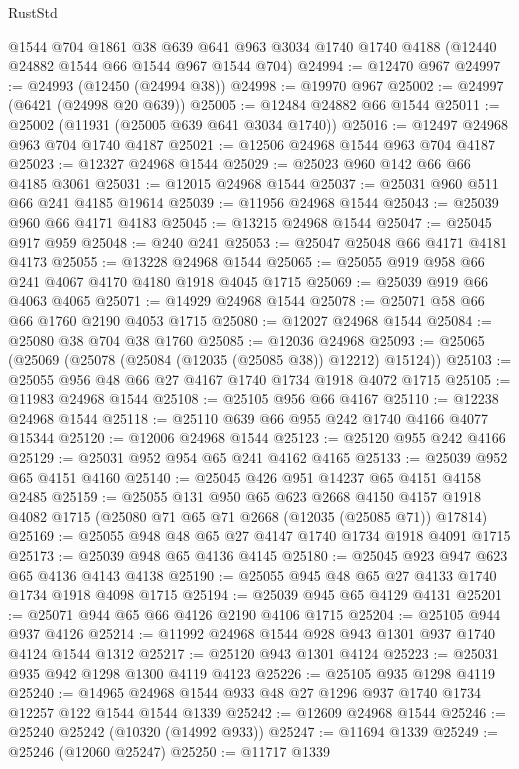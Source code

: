 \begin{lexlean}{RustStd}
\begin{coremodule}
    @1544
    @704
    @1861
    @38
    @639
    @641
    @963
    @3034
    @1740
    @1740
    @4188
    (@12440 @24882 @1544 @66 @1544 @967 @1544 @704)
@24994 := @12470 @967
@24997 := @24993 (@12450 (@24994 @38))
@24998 := @19970 @967
@25002 := @24997 (@6421 (@24998 @20 @639))
@25005 := @12484 @24882 @66 @1544
@25011 := @25002 (@11931 (@25005 @639 @641 @3034 @1740))
@25016 := @12497 @24968 @963 @704 @1740 @4187
@25021 := @12506 @24968 @1544 @963 @704 @4187
@25023 := @12327 @24968 @1544
@25029 := @25023 @960 @142 @66 @66 @4185 @3061
@25031 := @12015 @24968 @1544
@25037 := @25031 @960 @511 @66 @241 @4185 @19614
@25039 := @11956 @24968 @1544
@25043 := @25039 @960 @66 @4171 @4183
@25045 := @13215 @24968 @1544
@25047 := @25045 @917 @959
@25048 := @240 @241
@25053 := @25047 @25048 @66 @4171 @4181 @4173
@25055 := @13228 @24968 @1544
@25065 := @25055 @919 @958 @66 @241 @4067 @4170 @4180 @1918 @4045 @1715
@25069 := @25039 @919 @66 @4063 @4065
@25071 := @14929 @24968 @1544
@25078 := @25071 @58 @66 @66 @1760 @2190 @4053 @1715
@25080 := @12027 @24968 @1544
@25084 := @25080 @38 @704 @38 @1760
@25085 := @12036 @24968
@25093 := @25065 (@25069 (@25078 (@25084 (@12035 (@25085 @38)) @12212) @15124))
@25103 := @25055 @956 @48 @66 @27 @4167 @1740 @1734 @1918 @4072 @1715
@25105 := @11983 @24968 @1544
@25108 := @25105 @956 @66 @4167
@25110 := @12238 @24968 @1544
@25118 := @25110 @639 @66 @955 @242 @1740 @4166 @4077 @15344
@25120 := @12006 @24968 @1544
@25123 := @25120 @955 @242 @4166
@25129 := @25031 @952 @954 @65 @241 @4162 @4165
@25133 := @25039 @952 @65 @4151 @4160
@25140 := @25045 @426 @951 @14237 @65 @4151 @4158 @2485
@25159 := @25055
    @131
    @950
    @65
    @623
    @2668
    @4150
    @4157
    @1918
    @4082
    @1715
    (@25080 @71 @65 @71 @2668 (@12035 (@25085 @71)) @17814)
@25169 := @25055 @948 @48 @65 @27 @4147 @1740 @1734 @1918 @4091 @1715
@25173 := @25039 @948 @65 @4136 @4145
@25180 := @25045 @923 @947 @623 @65 @4136 @4143 @4138
@25190 := @25055 @945 @48 @65 @27 @4133 @1740 @1734 @1918 @4098 @1715
@25194 := @25039 @945 @65 @4129 @4131
@25201 := @25071 @944 @65 @66 @4126 @2190 @4106 @1715
@25204 := @25105 @944 @937 @4126
@25214 := @11992 @24968 @1544 @928 @943 @1301 @937 @1740 @4124 @1544 @1312
@25217 := @25120 @943 @1301 @4124
@25223 := @25031 @935 @942 @1298 @1300 @4119 @4123
@25226 := @25105 @935 @1298 @4119
@25240 := @14965 @24968 @1544 @933 @48 @27 @1296 @937 @1740 @1734 @12257 @122 @1544 @1544 @1339
@25242 := @12609 @24968 @1544
@25246 := @25240 @25242 (@10320 (@14992 @933))
@25247 := @11694 @1339
@25249 := @25246 (@12060 @25247)
@25250 := @11717 @1339

\end{coremodule}
\end{lexlean}
